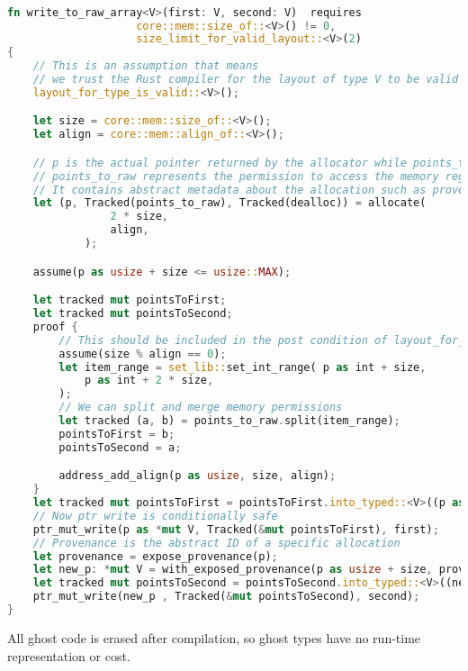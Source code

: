 \documentclass[conference]{IEEEtran}
\begin{document}
\begin{lstlisting}[language=Rust,style=colouredRust, caption={a pedagogical example showcasing how ghost memory permission converts unsafe raw pointer operation to safe code}, label = {9}]

fn write_to_raw_array<V>(first: V, second: V)  requires 
                    core::mem::size_of::<V>() != 0, 
                    size_limit_for_valid_layout::<V>(2)
{
    // This is an assumption that means 
    // we trust the Rust compiler for the layout of type V to be valid
    layout_for_type_is_valid::<V>();

    let size = core::mem::size_of::<V>();
    let align = core::mem::align_of::<V>();

    // p is the actual pointer returned by the allocator while points_to_raw and dealloc are ghost.
    // points_to_raw represents the permission to access the memory region pointed to by p 
    // It contains abstract metadata about the allocation such as provenance, size, alignment and memory value
    let (p, Tracked(points_to_raw), Tracked(dealloc)) = allocate(
                2 * size,
                align,
            );

    assume(p as usize + size <= usize::MAX);

    let tracked mut pointsToFirst;
    let tracked mut pointsToSecond;
    proof {
        // This should be included in the post condition of layout_for_type_is_valid
        assume(size % align == 0);
        let item_range = set_lib::set_int_range( p as int + size,
            p as int + 2 * size,
        );
        // We can split and merge memory permissions 
        let tracked (a, b) = points_to_raw.split(item_range);
        pointsToFirst = b;
        pointsToSecond = a;

        address_add_align(p as usize, size, align);
    }
    let tracked mut pointsToFirst = pointsToFirst.into_typed::<V>((p as usize) as usize);
    // Now ptr write is conditionally safe
    ptr_mut_write(p as *mut V, Tracked(&mut pointsToFirst), first);
    // Provenance is the abstract ID of a specific allocation
    let provenance = expose_provenance(p);
    let new_p: *mut V = with_exposed_provenance(p as usize + size, provenance);
    let tracked mut pointsToSecond = pointsToSecond.into_typed::<V>((new_p as usize) as usize);
    ptr_mut_write(new_p , Tracked(&mut pointsToSecond), second);
}
\end{lstlisting}
All ghost code is erased after compilation, so ghost types have no run-time representation or cost.
\end{document}
